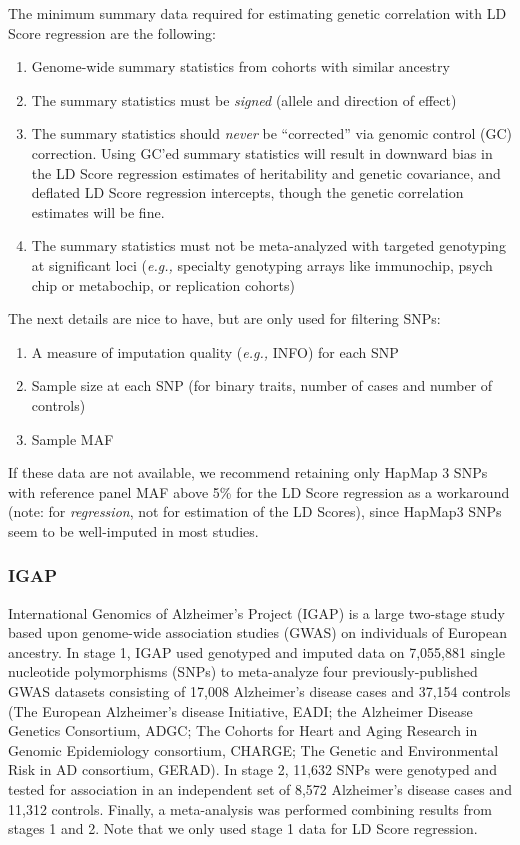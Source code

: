 \documentclass[11pt]{article}
\numberwithin{equation}{section}
\begin{document}
The minimum summary data required for estimating genetic correlation with LD Score regression are the following:
\begin{enumerate}
	\item Genome-wide summary statistics from cohorts with similar ancestry
	\item The summary statistics must be \emph{signed} (allele and direction of effect)
	\item The summary statistics should \emph{never} be ``corrected'' via genomic control (GC) correction. Using GC'ed
		summary statistics will result in downward bias in the LD Score regression estimates of heritability and
		genetic covariance, and deflated LD Score regression intercepts, though the genetic correlation estimates will be fine.
	\item The summary statistics must not be meta-analyzed with targeted genotyping at significant loci 
		(\emph{e.g.,} specialty genotyping arrays like immunochip, psych chip or metabochip, or replication cohorts) 
\end{enumerate}
The next details are nice to have, but are only used for filtering SNPs:
\begin{enumerate}
	\item A measure of imputation quality (\emph{e.g.,} INFO) for each SNP
	\item Sample size at each SNP (for binary traits, number of cases and number of controls)
	\item Sample MAF
\end{enumerate}
If these data are not available, we recommend retaining only HapMap 3 SNPs with reference panel MAF above 5\% for the LD Score regression as a workaround
(note: for \emph{regression}, not for estimation of the LD Scores), 
since HapMap3 SNPs seem to be well-imputed in most studies.


\subsubsection{IGAP}

International Genomics of Alzheimer's Project (IGAP) is a large two-stage study based upon genome-wide association studies (GWAS) on individuals of European ancestry. 
In stage 1, IGAP used genotyped and imputed data on 7,055,881 single nucleotide polymorphisms (SNPs) to meta-analyze four previously-published GWAS datasets consisting of 17,008 Alzheimer's disease cases and 37,154 controls 
(The European Alzheimer's disease Initiative, EADI; the Alzheimer Disease Genetics Consortium, ADGC; The Cohorts for Heart and Aging Research in Genomic Epidemiology consortium, CHARGE; The Genetic and Environmental Risk in AD consortium, GERAD). 
In stage 2, 11,632 SNPs were genotyped and tested for association in an independent set of 8,572 Alzheimer's disease cases and 11,312 controls. 
Finally, a meta-analysis was performed combining results from stages 1 and 2.
Note that we only used stage 1 data for LD Score regression.
\end{document}
